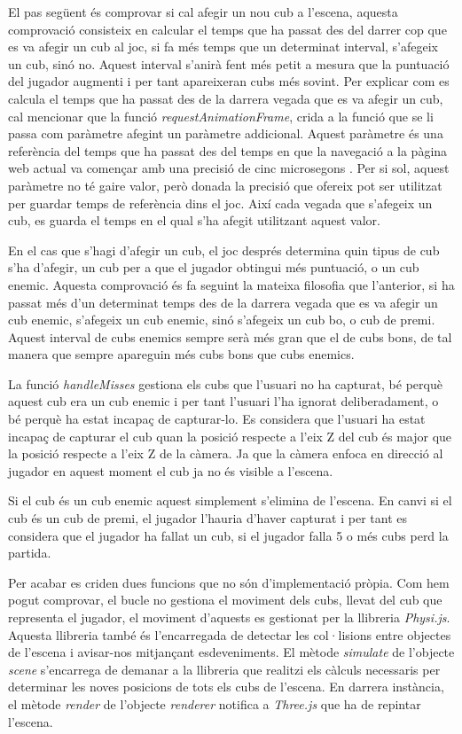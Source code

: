 \documentclass[12pt,a4paper,catalan]{article}
\begin{document}
	El pas següent és comprovar si cal afegir un nou cub a l'escena, aquesta comprovació consisteix en calcular el temps que ha passat des del darrer cop que es va afegir un cub al joc, si fa més temps que un determinat interval, s'afegeix un cub, sinó no. Aquest interval s'anirà fent més petit a mesura que la puntuació del jugador augmenti i per tant apareixeran cubs més sovint. Per explicar com es calcula el temps que ha passat des de la darrera vegada que es va afegir un cub, cal mencionar que la funció \textit{requestAnimationFrame}, crida a la funció que se li passa com paràmetre afegint un paràmetre addicional. Aquest paràmetre és una referència del temps que ha passat des del temps en que la navegació a la pàgina web actual va començar amb una precisió de cinc microsegons \cite{request-animation-frame}. Per si sol, aquest paràmetre no té gaire valor, però donada la precisió que ofereix pot ser utilitzat per guardar temps de referència dins el joc. Així cada vegada que s'afegeix un cub, es guarda el temps en el qual s'ha afegit utilitzant aquest valor.
	
	En el cas que s'hagi d'afegir un cub, el joc després determina quin tipus de cub s'ha d'afegir, un cub per a que el jugador obtingui més puntuació, o un cub enemic. Aquesta comprovació és fa seguint la mateixa filosofia que l'anterior, si ha passat més d'un determinat temps des de la darrera vegada que es va afegir un cub enemic, s'afegeix un cub enemic, sinó s'afegeix un cub bo, o cub de premi. Aquest interval de cubs enemics sempre serà més gran que el de cubs bons, de tal manera que sempre apareguin més cubs bons que cubs enemics.
	
	La funció \textit{handleMisses} gestiona els cubs que l'usuari no ha capturat, bé perquè aquest cub era un cub enemic i per tant l'usuari l'ha ignorat deliberadament, o bé perquè ha estat incapaç de capturar-lo. Es considera que l'usuari ha estat incapaç de capturar el cub quan la posició respecte a l'eix Z del cub és major que la posició respecte a l'eix Z de la càmera. Ja que la càmera enfoca en direcció al jugador en aquest moment el cub ja no és visible a l'escena.
	
	Si el cub és un cub enemic aquest simplement s'elimina de l'escena. En canvi si el cub és un cub de premi, el jugador l'hauria d'haver capturat i per tant es considera que el jugador ha fallat un cub, si el jugador falla 5 o més cubs perd la partida.
	
	Per acabar es criden dues funcions que no són d'implementació pròpia. Com hem pogut comprovar, el bucle no gestiona el moviment dels cubs, llevat del cub que representa el jugador, el moviment d'aquests es gestionat per la llibreria \textit{Physi.js}. Aquesta llibreria també és l'encarregada de detectar les col·lisions entre objectes de l'escena i avisar-nos mitjançant esdeveniments. El mètode \textit{simulate} de l'objecte \textit{scene} s'encarrega de demanar a la llibreria que realitzi els càlculs necessaris per determinar les noves posicions de tots els cubs de l'escena. En darrera instància, el mètode \textit{render} de l'objecte \textit{renderer} notifica a \textit{Three.js} que ha de repintar l'escena.
	
\end{document}

